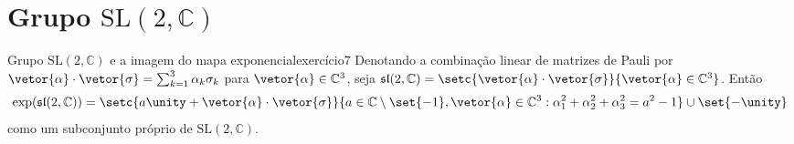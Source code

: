 \section[Grupo SL(2, C)]{Grupo \(\mathrm{SL}(2, \mathbb{C})\)}
\begin{proposition}{Grupo \(\mathrm{SL}(2, \mathbb{C})\) e a imagem do mapa exponencial}{exercício7}
    Denotando a combinação linear de matrizes de Pauli por \(\vetor{\alpha} \cdot \vetor{\sigma} = \sum_{k = 1}^3 \alpha_k \sigma_k\) para \(\vetor{\alpha} \in \mathbb{C}^3\), seja \(\mathfrak{sl}(2,\mathbb{C}) = \setc{\vetor{\alpha}\cdot\vetor{\sigma}}{\vetor{\alpha}\in \mathbb{C}^3}\). Então
    \begin{equation*}
        \exp(\mathfrak{sl}(2,\mathbb{C})) = \setc{a\unity + \vetor{\alpha}\cdot\vetor{\sigma}}{a \in \mathbb{C}\setminus\set{-1}, \vetor{\alpha} \in \mathbb{C}^3 : \alpha_1^2 + \alpha_2^2 + \alpha_3^2 = a^2 - 1}\cup\set{-\unity}
    \end{equation*}
    como um subconjunto próprio de \(\mathrm{SL}(2,\mathbb{C})\).
\end{proposition}

